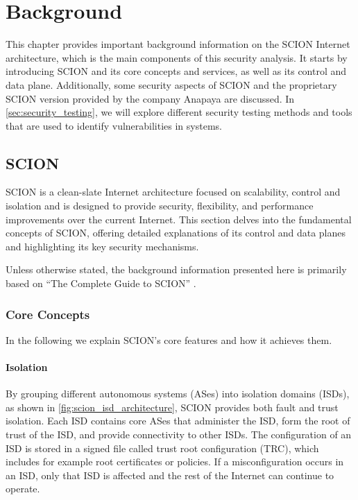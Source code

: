 \chapter{Background}
\label{ch:background}



This chapter provides important background information on the SCION Internet architecture, which is the main components of this security analysis.
It starts by introducing SCION and its core concepts and services, as well as its control and data plane.
Additionally, some security aspects of SCION and the proprietary SCION version provided by the company Anapaya are discussed.
In \cref{sec:security_testing}, we will explore different security testing methods and tools that are used to identify vulnerabilities in systems.


\section{SCION}

SCION \cite{Perrig2022} is a clean-slate Internet architecture focused on scalability, control and isolation and is designed to provide security, flexibility, and performance improvements over the current Internet.
This section delves into the fundamental concepts of SCION, offering detailed explanations of its control and data planes and highlighting its key security mechanisms.

Unless otherwise stated, the background information presented here is primarily based on  ``The Complete Guide to SCION'' \cite{Perrig2022}.

\subsection{Core Concepts}
In the following we explain SCION's core features and how it achieves them.
\subsubsection{Isolation}

By grouping different autonomous systems (ASes) into isolation domains (ISDs), as shown in \cref{fig:scion_isd_architecture}, SCION provides both fault and trust isolation.
Each ISD contains core ASes that administer the ISD, form the root of trust of the ISD, and provide connectivity to other ISDs.
The configuration of an ISD is stored in a signed file called trust root configuration (TRC), which includes for example root certificates or policies.
If a misconfiguration occurs in an ISD, only that ISD is affected and the rest of the Internet can continue to operate.

